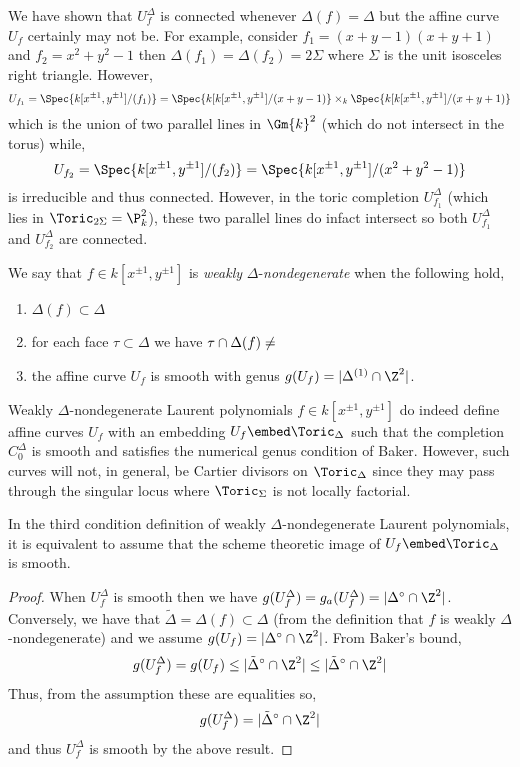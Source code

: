 \documentclass[12pt]{article}
\begin{document}
\begin{rmk}
We have shown that $U_f^\Delta$ is connected whenever $\Delta(f) = \Delta$ but the affine curve $U_f$ certainly may not be. For example, consider $f_1 = (x + y - 1)(x + y + 1)$ and $f_2 = x^2 + y^2 - 1$ then $\Delta(f_1) = \Delta(f_2) = 2 \Sigma$ where $\Sigma$ is the unit isosceles right triangle. However, 
\[ U_{f_1} = \Spec{k[x^{\pm 1}, y^{\pm 1}]/(f_1)} = \Spec{k[k[x^{\pm 1}, y^{\pm 1}]/(x + y - 1)} \times_k \Spec{k[k[x^{\pm 1}, y^{\pm 1}]/(x + y + 1)} \]
which is the union of two parallel lines in $\Gm{k}^2$ (which do not intersect in the torus) while,
\[ U_{f_2} = \Spec{k[x^{\pm 1}, y^{\pm 1}]/(f_2)} = \Spec{k[x^{\pm 1}, y^{\pm 1}]/(x^2 + y^2 - 1)} \]
is irreducible and thus connected. However, in the toric completion $U_{f_1}^\Delta$ (which lies in $\Toric_{2 \Sigma} = \P^2_k$), these two parallel lines do infact intersect so both $U_{f_1}^\Delta$ and $U_{f_2}^\Delta$ are connected.
\end{rmk}


\begin{defn}
We say that $f \in k[x^{\pm 1}, y^{\pm 1}]$ is \textit{weakly} $\Delta$-\textit{nondegenerate} when the following hold,
\begin{enumerate}
\item $\Delta(f) \subset \Delta$
\item for each face $\tau \subset \Delta$ we have $\tau \cap \Delta(f) \neq \empty$
\item the affine curve $U_f$ is smooth with genus $g(U_f) = | \Delta^{(1)} \cap \Z^2 |$. 
\end{enumerate}
\end{defn}
\noindent
Weakly $\Delta$-nondegenerate Laurent polynomials $f \in k[x^{\pm 1}, y^{\pm 1}]$ do indeed define affine curves $U_f$ with an embedding $U_f \embed \Toric_\Delta$ such that the completion $C_0^\Delta$ is smooth and satisfies the numerical genus condition of Baker. However, such curves will not, in general, be Cartier divisors on $\Toric_\Delta$ since they may pass through the singular locus where $\Toric_\Sigma$ is not locally factorial. 

\begin{lemma}
In the third condition definition of weakly $\Delta$-nondegenerate Laurent polynomials, it is equivalent to assume that the scheme theoretic image of $U_f \embed \Toric_\Delta$ is smooth. 
\end{lemma}

\begin{proof}
When $U_f^\Delta$ is smooth then we have $g(U_f^\Delta) = g_a(U_f^\Delta) = | \Delta^\circ \cap \Z^2|$. Conversely, we have that $\tilde{\Delta} = \Delta(f) \subset \Delta$ (from the definition that $f$ is weakly $\Delta$-nondegenerate) and we assume $g(U_f) = | \Delta^\circ \cap \Z^2 |$. From Baker's bound,
\[ g(U_f^\Delta) = g(U_f) \le |\tilde{\Delta}^\circ \cap \Z^2| \le |\tilde{\Delta}^\circ \cap \Z^2 | \] 
Thus, from the assumption these are equalities so,
\[ g(U_f^\Delta) = | \tilde{\Delta}^\circ \cap \Z^2 | \]
and thus $U_f^\Delta$ is smooth by the above result.
\end{proof}
\end{document}
